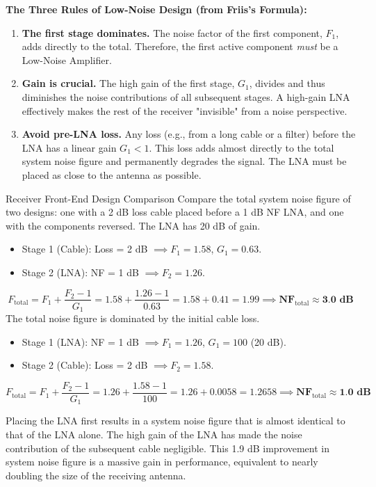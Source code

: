 \begin{warningbox}
    \textbf{The Three Rules of Low-Noise Design (from Friis's Formula):}
    \begin{enumerate}
        \item \textbf{The first stage dominates.} The noise factor of the first component, $F_1$, adds directly to the total. Therefore, the first active component \emph{must} be a Low-Noise Amplifier.
        \item \textbf{Gain is crucial.} The high gain of the first stage, $G_1$, divides and thus diminishes the noise contributions of all subsequent stages. A high-gain LNA effectively makes the rest of the receiver "invisible" from a noise perspective.
        \item \textbf{Avoid pre-LNA loss.} Any loss (e.g., from a long cable or a filter) before the LNA has a linear gain $G_1 < 1$. This loss adds almost directly to the total system noise figure and permanently degrades the signal. The LNA must be placed as close to the antenna as possible.
    \end{enumerate}
\end{warningbox}

\begin{workedexample}{Receiver Front-End Design Comparison}
     Compare the total system noise figure of two designs: one with a 2 dB loss cable placed before a 1 dB NF LNA, and one with the components reversed. The LNA has 20 dB of gain.
    
    \begin{itemize}
        \item Stage 1 (Cable): Loss = 2 dB $\implies F_1=1.58$, $G_1=0.63$.
        \item Stage 2 (LNA): NF = 1 dB $\implies F_2=1.26$.
    \end{itemize}
    \[ F_{\text{total}} = F_1 + \frac{F_2 - 1}{G_1} = 1.58 + \frac{1.26 - 1}{0.63} = 1.58 + 0.41 = 1.99 \implies \textbf{NF}_{\text{total}} \approx \textbf{3.0 dB} \]
    The total noise figure is dominated by the initial cable loss.

    \begin{itemize}
        \item Stage 1 (LNA): NF = 1 dB $\implies F_1=1.26$, $G_1=100$ (20 dB).
        \item Stage 2 (Cable): Loss = 2 dB $\implies F_2=1.58$.
    \end{itemize}
    \[ F_{\text{total}} = F_1 + \frac{F_2 - 1}{G_1} = 1.26 + \frac{1.58 - 1}{100} = 1.26 + 0.0058 = 1.2658 \implies \textbf{NF}_{\text{total}} \approx \textbf{1.0 dB} \]

     Placing the LNA first results in a system noise figure that is almost identical to that of the LNA alone. The high gain of the LNA has made the noise contribution of the subsequent cable negligible. This 1.9 dB improvement in system noise figure is a massive gain in performance, equivalent to nearly doubling the size of the receiving antenna.
\end{workedexample}


